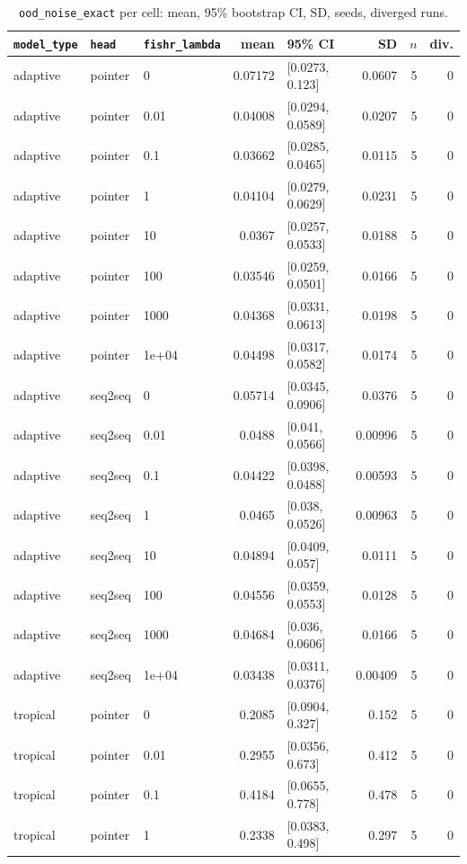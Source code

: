 \documentclass[10pt]{article}
\begin{document}
{\small
\begin{longtable}{lllrlrrr}
\caption{\texttt{ood\_noise\_exact} per cell: mean, 95\% bootstrap CI, SD, seeds, diverged runs.}\label{tab:summary-ood_noise_exact}\\
\toprule
\texttt{model\_type} & \texttt{head} & \texttt{fishr\_lambda} & mean & 95\% CI & SD & $n$ & div.\\
\midrule
\endhead
adaptive & pointer & 0 & 0.07172 & [0.0273, 0.123] & 0.0607 & 5 & 0\\
adaptive & pointer & 0.01 & 0.04008 & [0.0294, 0.0589] & 0.0207 & 5 & 0\\
adaptive & pointer & 0.1 & 0.03662 & [0.0285, 0.0465] & 0.0115 & 5 & 0\\
adaptive & pointer & 1 & 0.04104 & [0.0279, 0.0629] & 0.0231 & 5 & 0\\
adaptive & pointer & 10 & 0.0367 & [0.0257, 0.0533] & 0.0188 & 5 & 0\\
adaptive & pointer & 100 & 0.03546 & [0.0259, 0.0501] & 0.0166 & 5 & 0\\
adaptive & pointer & 1000 & 0.04368 & [0.0331, 0.0613] & 0.0198 & 5 & 0\\
adaptive & pointer & 1e+04 & 0.04498 & [0.0317, 0.0582] & 0.0174 & 5 & 0\\
adaptive & seq2seq & 0 & 0.05714 & [0.0345, 0.0906] & 0.0376 & 5 & 0\\
adaptive & seq2seq & 0.01 & 0.0488 & [0.041, 0.0566] & 0.00996 & 5 & 0\\
adaptive & seq2seq & 0.1 & 0.04422 & [0.0398, 0.0488] & 0.00593 & 5 & 0\\
adaptive & seq2seq & 1 & 0.0465 & [0.038, 0.0526] & 0.00963 & 5 & 0\\
adaptive & seq2seq & 10 & 0.04894 & [0.0409, 0.057] & 0.0111 & 5 & 0\\
adaptive & seq2seq & 100 & 0.04556 & [0.0359, 0.0553] & 0.0128 & 5 & 0\\
adaptive & seq2seq & 1000 & 0.04684 & [0.036, 0.0606] & 0.0166 & 5 & 0\\
adaptive & seq2seq & 1e+04 & 0.03438 & [0.0311, 0.0376] & 0.00409 & 5 & 0\\
tropical & pointer & 0 & 0.2085 & [0.0904, 0.327] & 0.152 & 5 & 0\\
tropical & pointer & 0.01 & 0.2955 & [0.0356, 0.673] & 0.412 & 5 & 0\\
tropical & pointer & 0.1 & 0.4184 & [0.0655, 0.778] & 0.478 & 5 & 0\\
tropical & pointer & 1 & 0.2338 & [0.0383, 0.498] & 0.297 & 5 & 0\\

\end{longtable}}
\end{document}
